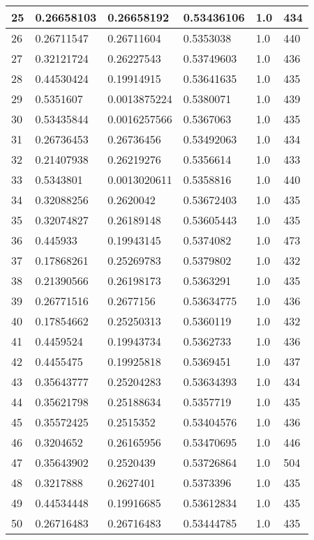 \begin{longtable}{|l|l|l|l|l|l|}
25 & 0.26658103 & 0.26658192 & 0.53436106 & 1.0 & 434 \\ \hline 
26 & 0.26711547 & 0.26711604 & 0.5353038 & 1.0 & 440 \\ \hline 
27 & 0.32121724 & 0.26227543 & 0.53749603 & 1.0 & 436 \\ \hline 
28 & 0.44530424 & 0.19914915 & 0.53641635 & 1.0 & 435 \\ \hline 
29 & 0.5351607 & 0.0013875224 & 0.5380071 & 1.0 & 439 \\ \hline 
30 & 0.53435844 & 0.0016257566 & 0.5367063 & 1.0 & 435 \\ \hline 
31 & 0.26736453 & 0.26736456 & 0.53492063 & 1.0 & 434 \\ \hline 
32 & 0.21407938 & 0.26219276 & 0.5356614 & 1.0 & 433 \\ \hline 
33 & 0.5343801 & 0.0013020611 & 0.5358816 & 1.0 & 440 \\ \hline 
34 & 0.32088256 & 0.2620042 & 0.53672403 & 1.0 & 435 \\ \hline 
35 & 0.32074827 & 0.26189148 & 0.53605443 & 1.0 & 435 \\ \hline 
36 & 0.445933 & 0.19943145 & 0.5374082 & 1.0 & 473 \\ \hline 
37 & 0.17868261 & 0.25269783 & 0.5379802 & 1.0 & 432 \\ \hline 
38 & 0.21390566 & 0.26198173 & 0.5363291 & 1.0 & 435 \\ \hline 
39 & 0.26771516 & 0.2677156 & 0.53634775 & 1.0 & 436 \\ \hline 
40 & 0.17854662 & 0.25250313 & 0.5360119 & 1.0 & 432 \\ \hline 
41 & 0.4459524 & 0.19943734 & 0.5362733 & 1.0 & 436 \\ \hline 
42 & 0.4455475 & 0.19925818 & 0.5369451 & 1.0 & 437 \\ \hline 
43 & 0.35643777 & 0.25204283 & 0.53634393 & 1.0 & 434 \\ \hline 
44 & 0.35621798 & 0.25188634 & 0.5357719 & 1.0 & 435 \\ \hline 
45 & 0.35572425 & 0.2515352 & 0.53404576 & 1.0 & 436 \\ \hline 
46 & 0.3204652 & 0.26165956 & 0.53470695 & 1.0 & 446 \\ \hline 
47 & 0.35643902 & 0.2520439 & 0.53726864 & 1.0 & 504 \\ \hline 
48 & 0.3217888 & 0.2627401 & 0.5373396 & 1.0 & 435 \\ \hline 
49 & 0.44534448 & 0.19916685 & 0.53612834 & 1.0 & 435 \\ \hline 
50 & 0.26716483 & 0.26716483 & 0.53444785 & 1.0 & 435 \\ \hline 
\end{longtable}